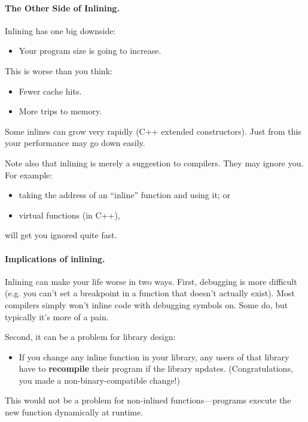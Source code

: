 \documentclass[11pt]{article}
\newenvironment{itemizep}{
 \begin{itemize}
  \setlength{\itemsep}{0pt}
  \setlength{\parsep}{3pt}
  \setlength{\topsep}{3pt}
  \setlength{\partopsep}{0pt}
  \setlength{\leftmargin}{1.5em}
  \setlength{\labelwidth}{1em}
  \setlength{\labelsep}{0.5em} }
 {\end{itemize}}
\begin{document}
\paragraph{The Other Side of Inlining.}
Inlining has one big downside:
  \begin{itemizep}
    \item Your program size is going to increase.
  \end{itemizep}
   This is worse than you think:
      \begin{itemizep}
        \item Fewer cache hits.
        \item More trips to memory.
      \end{itemizep}
   Some inlines can grow very rapidly (C++ extended constructors).
  Just from this your performance may go down easily.

  Note also that inlining is merely a suggestion to compilers.
  They may ignore you.
  For example:
  \begin{itemizep}
    \item taking the address of an ``inline'' function and using it; or
    \item virtual functions (in C++),
  \end{itemizep}
  will get you ignored quite fast.

\paragraph{Implications of inlining.} Inlining can make your life worse in two ways.
First, debugging is more difficult (e.g. you can't set a breakpoint in a function that
  doesn't actually exist).
 Most compilers simply won't inline code with debugging symbols on.
 Some do, but typically it's more of a pain.

Second, it can be a problem for library design:
  \begin{itemizep}
    \item If you change any inline function in your library, any users
      of that library have to {\bf recompile} their program if the
      library updates. (Congratulations, you made a non-binary-compatible change!)
  \end{itemizep}
This would not be a problem for non-inlined functions---programs execute the new function
dynamically at runtime.



\end{document}

